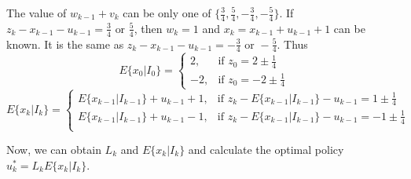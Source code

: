 \documentclass{article}
\begin{document}
    The value of $w_{k-1}+v_k$ can be only one of $\{\frac{3}{4},\frac{5}{4},-\frac{3}{4},-\frac{5}{4}\}$. If $z_k-x_{k-1}-u_{k-1}=\frac{3}{4}\text{ or }\frac{5}{4}$, then $w_k=1$ and $x_k=x_{k-1}+u_{k-1}+1$ can be known. It is the same as $z_k-x_{k-1}-u_{k-1}=-\frac{3}{4}\text{ or }-\frac{5}{4}$. Thus
    \begin{equation*}
        E\{x_0|I_0\}=\begin{cases}
            2, & \text{if } z_0=2\pm\frac{1}{4}\\
            -2, & \text{if }  z_0=-2\pm\frac{1}{4}
        \end{cases}
    \end{equation*}
    \begin{equation*}
        E\{x_k|I_k\} = \begin{cases}
            E\{x_{k-1}|I_{k-1}\}+u_{k-1}+1, & \text{if } z_{k}-E\{x_{k-1}|I_{k-1}\}-u_{k-1}=1\pm\frac{1}{4}\\
            E\{x_{k-1}|I_{k-1}\}+u_{k-1}-1, & \text{if } z_{k}-E\{x_{k-1}|I_{k-1}\}-u_{k-1}=-1\pm\frac{1}{4}\\
        \end{cases}
    \end{equation*}

    Now, we can obtain $L_k$ and $E\{x_k|I_k\}$ and calculate the optimal policy $u_k^*=L_kE\{x_k|I_k\}$.
\end{document}
